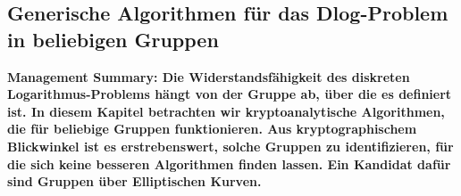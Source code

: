 \begin{refsegment}
\newpage
\section{Generische Algorithmen für das Dlog-Problem in beliebigen Gruppen}
\label{generic}

{\bf Management Summary: Die Widerstandsfähigkeit des diskreten Logarithmus-Pro\-b\-lems
hängt von der Gruppe ab, über die es definiert ist. In diesem Kapitel betrachten wir kryptoanalytische Algorithmen, die für beliebige Gruppen funktionieren. Aus kryptographischem Blickwinkel ist es erstrebenswert, solche Gruppen zu identifizieren, für die sich keine besseren Algorithmen finden lassen. Ein Kandidat dafür sind Gruppen über Elliptischen Kurven.\\[0.1cm]}


\end{refsegment}
